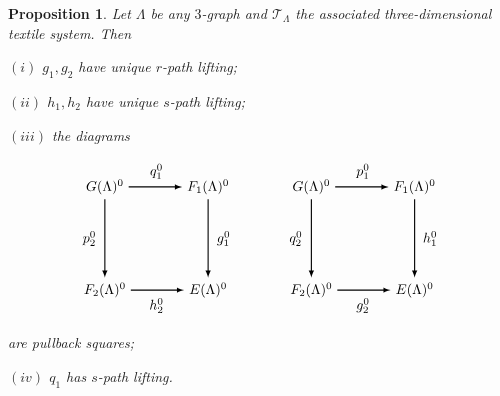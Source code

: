 \documentclass[a4paper,reqno,12pt]{amsart}
\newtheorem{prop}[thm]{Proposition}
\theoremstyle{definition}
\theoremstyle{remark}
\begin{document}
\begin{prop}\label{pro path liftings for 3-graph textile}
Let $\Lambda$ be any $3$-graph and $\mathcal{T}_\Lambda$ the associated three-dimensional textile system. Then 

$(i)$ $g_1,g_2$ have unique $r$-path lifting;

$(ii)$ $h_1,h_2$ have unique $s$-path lifting;

$(iii)$ the diagrams 

\[
\begin{tikzpicture}[scale=1.3]
\node[] (A1) at (0,0) {$G(\Lambda)^0$};
\node[] (A2) at (2,0) {$F_1(\Lambda)^0$};
\node[] (A3) at (4,0) {$G(\Lambda)^0$};
\node[] (A4) at (6,0) {$F_1(\Lambda)^0$};

\node[] (B1) at (0,-2) {$F_2(\Lambda)^0$};
\node[] (B2) at (2,-2) {$E(\Lambda)^0$};
\node[] (B3) at (4,-2) {$F_2(\Lambda)^0$};
\node[] (B4) at (6,-2) {$E(\Lambda)^0$};


\path[->, >=latex,thick] (A1) edge [] node[]{} (A2);
\path[->, >=latex,thick] (B1) edge [] node[]{} (B2);
\path[->, >=latex,thick] (A3) edge [] node[]{} (A4);
\path[->, >=latex,thick] (B3) edge [] node[]{} (B4);

\path[->, >=latex,thick] (A1) edge [] node[]{} (B1);
\path[->, >=latex,thick] (A2) edge [] node[]{} (B2);
\path[->, >=latex,thick] (A3) edge [] node[]{} (B3);
\path[->, >=latex,thick] (A4) edge [] node[]{} (B4);

\node at (1,0.3) {$q_1^0$};
\node at (5,0.3) {$p_1^0$};
\node at (1,-2.3) {$h_2^0$};
\node at (5,-2.3) {$g_2^0$};

\node at (-0.3,-1) {$p_2^0$};
\node at (2.3,-1) {$g_1^0$};
\node at (3.7,-1) {$q_2^0$};
\node at (6.3,-1) {$h_1^0$};
\end{tikzpicture}
\]
are pullback squares;

$(iv)$ $q_1$ has $s$-path lifting.

\end{prop}
\end{document}
